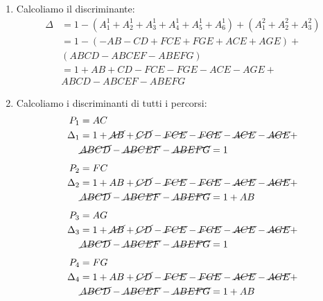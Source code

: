 \documentclass[a4paper]{article}
\begin{document}
\begin{example}
\begin{enumerate}
    \item Calcoliamo il discriminante:
      \[
        \begin{aligned}
          \Delta &= 1 - \left( A_1^1 + A_2^1 + A_3^1 + A_4^1 + A_5^1 + A_6^1 \right) +
                 \left( A_1^2 + A_2^2 + A_3^2 \right)\\
                 &= 1 - \left( -AB - CD + FCE + FGE + ACE + AGE \right) +\\
                 &\left( ABCD - ABCEF - ABEFG \right)\\
                 &= 1 + AB + CD - FCE - FGE - ACE - AGE + \\
                 &ABCD - ABCEF - ABEFG
        \end{aligned}
      \]
    \item Calcoliamo i discriminanti di tutti i percorsi:
      \[
        \begin{aligned}
          P_1 &= AC\\
          \Delta_1 &= 1 + \cancel{AB} + \cancel{CD} - \cancel{FCE} - \cancel{FGE} - \cancel{ACE} - \cancel{AGE} +\\
                  &\cancel{ABCD} - \cancel{ABCEF} - \cancel{ABEFG} = 1
        \end{aligned}
      \] 
      \[
        \begin{aligned}
          P_2 &= FC\\
          \Delta_2 &= 1 + AB + \cancel{CD} - \cancel{FCE} - \cancel{FGE} - \cancel{ACE} - \cancel{AGE} +\\
                  &\cancel{ABCD} - \cancel{ABCEF} - \cancel{ABEFG} = 1 + AB
        \end{aligned}
      \] 
      \[
        \begin{aligned}
          P_3 &= AG\\
          \Delta_3 &= 1 + \cancel{AB} + \cancel{CD} - \cancel{FCE} - \cancel{FGE} - \cancel{ACE} - \cancel{AGE} +\\
                  &\cancel{ABCD} - \cancel{ABCEF} - \cancel{ABEFG} = 1
        \end{aligned}
      \]
      \[
        \begin{aligned}
          P_4 &= FG\\
          \Delta_4 &= 1 + AB + \cancel{CD} - \cancel{FCE} - \cancel{FGE} - \cancel{ACE} - \cancel{AGE} +\\
                  &\cancel{ABCD} - \cancel{ABCEF} - \cancel{ABEFG} = 1 + AB
        \end{aligned}
      \]


\end{enumerate}
\end{example}
\end{document}

